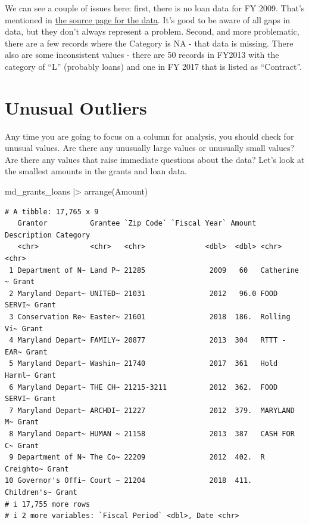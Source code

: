 \documentclass[
  letterpaper,
  DIV=11,
  numbers=noendperiod]{scrreprt}
\newenvironment{Shaded}{\begin{snugshade}}{\end{snugshade}}
\newcommand{\FunctionTok}[1]{\textcolor[rgb]{0.28,0.35,0.67}{#1}}
\newcommand{\NormalTok}[1]{\textcolor[rgb]{0.00,0.23,0.31}{#1}}
\newcommand{\SpecialCharTok}[1]{\textcolor[rgb]{0.37,0.37,0.37}{#1}}
\begin{document}
We can see a couple of issues here: first, there is no loan data for FY
2009. That's mentioned in
\href{https://opendata.maryland.gov/Budget/State-of-Maryland-Grant-and-Loan-Data-FY2009-to-FY/absk-avps}{the
source page for the data}. It's good to be aware of all gaps in data,
but they don't always represent a problem. Second, and more problematic,
there are a few records where the Category is NA - that data is missing.
There also are some inconsistent values - there are 50 records in FY2013
with the category of ``L'' (probably loans) and one in FY 2017 that is
listed as ``Contract''.

\hypertarget{unusual-outliers}{%
\section{Unusual Outliers}\label{unusual-outliers}}

Any time you are going to focus on a column for analysis, you should
check for unusual values. Are there any unusually large values or
unusually small values? Are there any values that raise immediate
questions about the data? Let's look at the smallest amounts in the
grants and loan data.

\begin{Shaded}
\begin{Highlighting}[]
\NormalTok{md\_grants\_loans }\SpecialCharTok{|\textgreater{}} 
  \FunctionTok{arrange}\NormalTok{(Amount)}
\end{Highlighting}
\end{Shaded}

\begin{verbatim}
# A tibble: 17,765 x 9
   Grantor          Grantee `Zip Code` `Fiscal Year` Amount Description Category
   <chr>            <chr>   <chr>              <dbl>  <dbl> <chr>       <chr>   
 1 Department of N~ Land P~ 21285               2009   60   Catherine ~ Grant   
 2 Maryland Depart~ UNITED~ 21031               2012   96.0 FOOD SERVI~ Grant   
 3 Conservation Re~ Easter~ 21601               2018  186.  Rolling Vi~ Grant   
 4 Maryland Depart~ FAMILY~ 20877               2013  304   RTTT - EAR~ Grant   
 5 Maryland Depart~ Washin~ 21740               2017  361   Hold Harml~ Grant   
 6 Maryland Depart~ THE CH~ 21215-3211          2012  362.  FOOD SERVI~ Grant   
 7 Maryland Depart~ ARCHDI~ 21227               2012  379.  MARYLAND M~ Grant   
 8 Maryland Depart~ HUMAN ~ 21158               2013  387   CASH FOR C~ Grant   
 9 Department of N~ The Co~ 22209               2012  402.  R Creighto~ Grant   
10 Governor's Offi~ Court ~ 21204               2018  411.  Children's~ Grant   
# i 17,755 more rows
# i 2 more variables: `Fiscal Period` <dbl>, Date <chr>
\end{verbatim}
\end{document}
